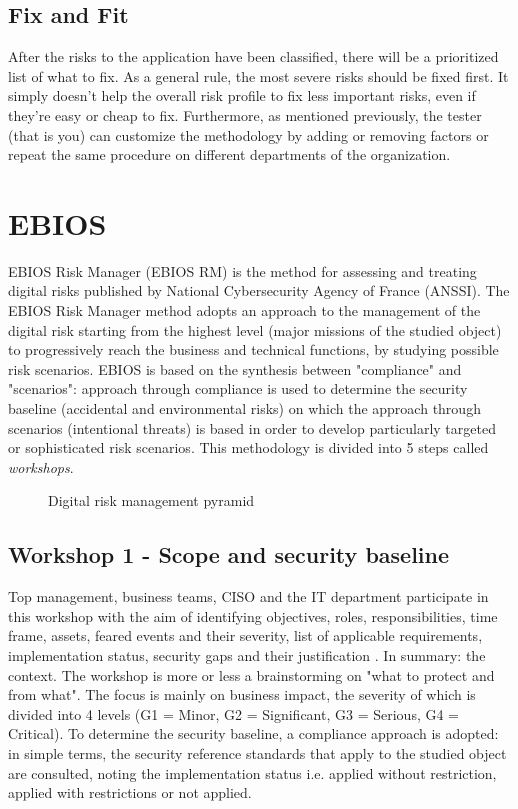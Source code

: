 \subsection{Fix and Fit}
After the risks to the application have been classified, there will be a prioritized list of what to fix. As a general rule, the most severe risks should be fixed first. It simply doesn’t help the overall risk profile to fix less important risks, even if they’re easy or cheap to fix.\newline
Furthermore, as mentioned previously, the tester (that is you) can customize the methodology by adding or removing factors or repeat the same procedure on different departments of the organization.

\section{EBIOS}
EBIOS Risk Manager (EBIOS RM) \cite{ANSSI2019} is the method for assessing and treating digital risks published by National Cybersecurity Agency of France (ANSSI). The EBIOS Risk Manager method adopts an approach to the management of the digital risk starting from the highest level (major missions of the studied object) to progressively reach the business and technical functions, by studying possible risk scenarios. EBIOS is based on the synthesis between "compliance" and "scenarios": approach through compliance is used to determine the security baseline (accidental and environmental risks) on which the approach through scenarios (intentional threats) is based in order to develop particularly targeted or sophisticated risk scenarios. This methodology is divided into 5 steps called \textit{workshops}.
\begin{figure}[H]
  \centering
  
  \caption{Digital risk management pyramid}
\end{figure}
\noindent
\subsection{Workshop 1 - Scope and security baseline}
Top management, business teams, CISO and the IT department participate in this workshop with the aim of identifying objectives, roles, responsibilities, time frame, assets, feared events and their severity, list of applicable requirements, implementation status, security gaps and their justification . In summary: the context. The workshop is more or less a brainstorming on "what to protect and from what". The focus is mainly on business impact, the severity of which is divided into 4 levels (G1 = Minor, G2 = Significant, G3 = Serious, G4 = Critical). To determine the security baseline, a compliance approach is adopted: in simple terms, the security reference standards that apply to the studied object are consulted, noting the implementation status i.e. applied without restriction, applied with restrictions or not applied.
